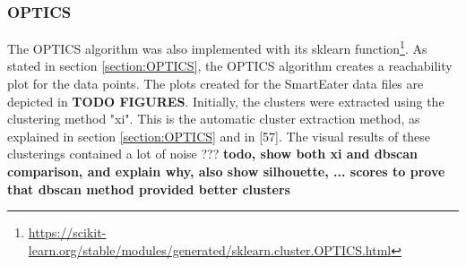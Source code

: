



  


\subsubsection{OPTICS}
The OPTICS algorithm was also implemented with its sklearn function\footnote{\url{https://scikit-learn.org/stable/modules/generated/sklearn.cluster.OPTICS.html}}. As stated in section \ref{section:OPTICS}, the OPTICS algorithm creates a reachability plot for the data points. The plots created for the SmartEater data files are depicted in \textbf{TODO FIGURES}. Initially, the clusters were extracted using the clustering method "xi". This is the automatic cluster extraction method, as explained in section \ref{section:OPTICS} and in \textcite{OPTICS}[57]. The visual results of these clusterings contained a lot of noise ??? \textbf{todo, show both xi and dbscan comparison, and explain why, also show silhouette, ... scores to prove that dbscan method provided better clusters}










